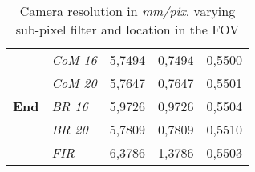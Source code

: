 \begin{table}[t!]
\begin{tabular}{|cl|p{2.3cm}|p{2.3cm}|p{2.3cm}|}
  \hline
\multirow{5}{*}{\textbf{End}}    & \textit{CoM 16} & 5,7494                            & 0,7494                             & 0,5500                                  \\
                                 & \textit{CoM 20} & 5,7647                            & 0,7647                             & 0,5501                                  \\
                                 & \textit{BR 16}  & 5,9726                            & 0,9726                             & 0,5504                                  \\
                                 & \textit{BR 20}  & 5,7809                            & 0,7809                             & 0,5510                                  \\
                                 & \textit{FIR}    & 6,3786                            & 1,3786                             & 0,5503                                 \\
    \hline
\end{tabular}
\caption{Camera resolution in \textit{mm/pix}, varying sub-pixel filter and location in the \acs{FOV}}
\label{tab:exp3:res2}
\end{table}